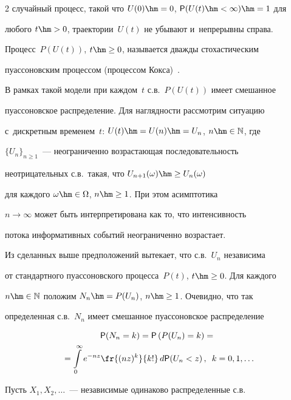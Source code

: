 \begin{multicols}{2}
случайный процесс, такой что $U(0)\hm=0$, ${\sf P}(U(t)\hm<\infty)\hm=1$ для


любого $t\hm>0$, траектории~$U(t)$ не убывают и~непрерывны справа.


Процесс~$P(U(t))$, $t\hm\geq0$, называется дважды стохастическим


пуассоновским процессом (процессом Кокса)~\cite{Grandell1976}.





В рамках такой модели при каждом~$t$ с.в.~$P(U(t))$ имеет смешанное


пуассоновское распределение. Для наглядности рассмотрим ситуацию 


с~дискретным временем~$t$: $U(t)\hm=U(n)\hm=U_n$, $n\hm\in\mathbb{N}$, где


$\{U_n\}_{n\ge1}$~--- неограниченно возрастающая последовательность


неотрицательных с.в.\ такая, что $U_{n+1}(\omega)\hm\ge U_{n}(\omega)$


для каждого $\omega\hm\in\Omega$, $n\hm\ge1$. При этом асимптотика


$n\to\infty$ может быть интерпретирована как то, что интенсивность


потока информативных событий неограниченно возрастает.





Из сделанных выше предположений вытекает, что с.в.~$U_n$ независима


от стандартного пуассоновского процесса~$P(t)$, $t\hm\ge0$. Для каждого


$n\hm\in\mathbb{N}$ положим $N_n\hm=P(U_n)$, $n\hm\ge1$. Очевидно, что так


определенная с.в.~$N_n$ имеет смешанное пуассоновское распределение


\begin{multline*}


{\sf P}(N_n=k)={\sf P}\left(P(U_n)=k\right)={}\\


{}=\int\limits_{0}^{\infty}


e^{-nz}\fr{(nz)^k}{k!}\,d{\sf P}(U_n<z)\,,\enskip


 k=0,1,\ldots


\end{multline*}





Пусть $X_1,X_2,\ldots $~--- независимые одинаково распределенные с.в.\ 



\end{multicols}
